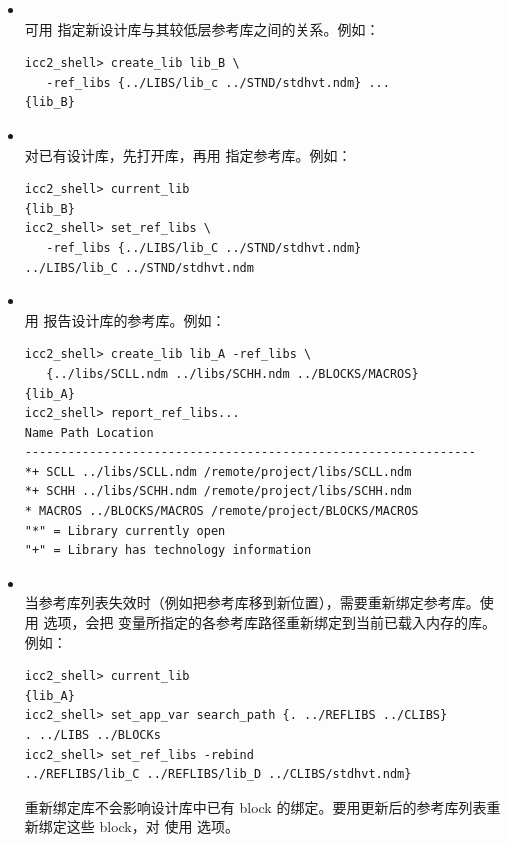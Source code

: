 \begin{itemize}
  \item {}\\
    可用  指定新设计库与其较低层参考库之间的关系。例如：
\begin{lstlisting}
icc2_shell> create_lib lib_B \
   -ref_libs {../LIBS/lib_c ../STND/stdhvt.ndm} ...
{lib_B}
\end{lstlisting}

  \item {}\\
    对已有设计库，先打开库，再用  指定参考库。例如：
\begin{lstlisting}
icc2_shell> current_lib
{lib_B}
icc2_shell> set_ref_libs \
   -ref_libs {../LIBS/lib_C ../STND/stdhvt.ndm}
../LIBS/lib_C ../STND/stdhvt.ndm
\end{lstlisting}

  \item {}\\
    用  报告设计库的参考库。例如：
\begin{lstlisting}
icc2_shell> create_lib lib_A -ref_libs \
   {../libs/SCLL.ndm ../libs/SCHH.ndm ../BLOCKS/MACROS}
{lib_A}
icc2_shell> report_ref_libs...
Name Path Location
---------------------------------------------------------------
*+ SCLL ../libs/SCLL.ndm /remote/project/libs/SCLL.ndm
*+ SCHH ../libs/SCHH.ndm /remote/project/libs/SCHH.ndm
* MACROS ../BLOCKS/MACROS /remote/project/BLOCKS/MACROS
"*" = Library currently open
"+" = Library has technology information
\end{lstlisting}

  \item {}\\
    当参考库列表失效时（例如把参考库移到新位置），需要重新绑定参考库。使用  选项，会把  变量所指定的各参考库路径重新绑定到当前已载入内存的库。例如：
\begin{lstlisting}
icc2_shell> current_lib
{lib_A}
icc2_shell> set_app_var search_path {. ../REFLIBS ../CLIBS}
. ../LIBS ../BLOCKs
icc2_shell> set_ref_libs -rebind
../REFLIBS/lib_C ../REFLIBS/lib_D ../CLIBS/stdhvt.ndm}
\end{lstlisting}

    重新绑定库不会影响设计库中已有 block 的绑定。要用更新后的参考库列表重新绑定这些 block，对  使用  选项。
\end{itemize}

